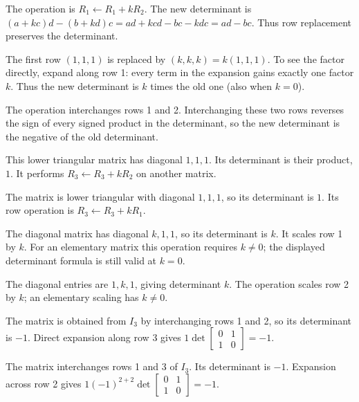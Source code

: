 The operation is $R_1\leftarrow R_1+kR_2$. The new determinant is $(a+kc)d-(b+kd)c=ad+kcd-bc-kdc=ad-bc$. Thus row replacement preserves the determinant.

The first row $(1,1,1)$ is replaced by $(k,k,k)=k(1,1,1)$. To see the factor directly, expand along row 1: every term in the expansion gains exactly one factor $k$. Thus the new determinant is $k$ times the old one (also when $k=0$).

The operation interchanges rows 1 and 2. Interchanging these two rows reverses the sign of every signed product in the determinant, so the new determinant is the negative of the old determinant.

This lower triangular matrix has diagonal $1,1,1$. Its determinant is their product, $1$. It performs $R_3\leftarrow R_3+kR_2$ on another matrix.

The matrix is lower triangular with diagonal $1,1,1$, so its determinant is $1$. Its row operation is $R_3\leftarrow R_3+kR_1$.

The diagonal matrix has diagonal $k,1,1$, so its determinant is $k$. It scales row 1 by $k$. For an elementary matrix this operation requires $k\ne0$; the displayed determinant formula is still valid at $k=0$.

The diagonal entries are $1,k,1$, giving determinant $k$. The operation scales row 2 by $k$; an elementary scaling has $k\ne0$.

The matrix is obtained from $I_3$ by interchanging rows 1 and 2, so its determinant is $-1$. Direct expansion along row 3 gives $1\det\left[\begin{smallmatrix}0&1\\1&0\end{smallmatrix}\right]=-1$.

The matrix interchanges rows 1 and 3 of $I_3$. Its determinant is $-1$. Expansion across row 2 gives $1(-1)^{2+2}\det\left[\begin{smallmatrix}0&1\\1&0\end{smallmatrix}\right]=-1$.

